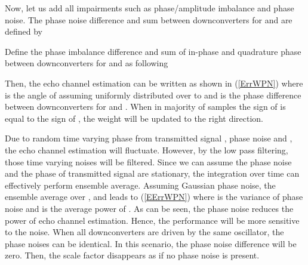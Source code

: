 \documentclass[twocolumn]{IEEEtran}
\begin{document}
\begin{figure*}[!t]
\setlength{\arraycolsep}{0.0em}


\setlength{\arraycolsep}{5pt} \hrulefill
\vspace*{4pt}
\end{figure*}

Now, let us add all impairments such as phase/amplitude imbalance
and phase noise. The phase noise difference and sum between
downconverters for  and  are defined by


Define the phase imbalance difference and sum of in-phase and
quadrature phase between downconverters for  and  as
following


Then, the echo channel estimation can be written as shown in
(\ref{ErrWPN}) where  is the angle of  assuming
uniformly distributed over  to  and  is the phase
difference between downconverters for  and . When in
majority of samples the sign of  is equal to the sign of , the weight will be
updated to the right direction.

Due to random time varying phase from transmitted signal
, phase noise  and , the
echo channel estimation will fluctuate. However, by the low pass
filtering, those time varying noises will be filtered. Since we can
assume the phase noise and the phase of transmitted signal are
stationary, the integration over time can effectively perform
ensemble average. Assuming Gaussian phase noise, the ensemble
average over ,  and  leads to
(\ref{EErrWPN}) where  is the variance of phase noise and
 is the average power of . As can be seen, the phase noise
reduces the power of echo channel estimation. Hence, the performance
will be more sensitive to the noise. When all downconverters are
driven by the same oscillator, the phase noises can be identical. In
this scenario, the phase noise difference 
will be zero. Then, the scale factor  disappears as
if no phase noise is present.



 \nocite{*}

\end{document}
